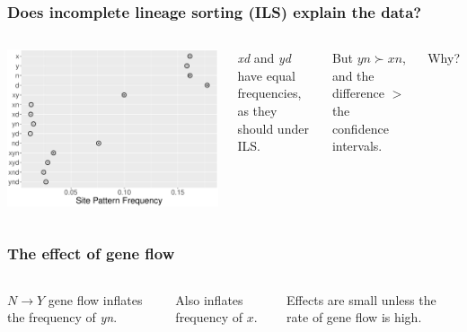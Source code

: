 \documentclass[pdftex,12pt]{beamer}
\begin{document}
\begin{frame}
  \frametitle{Does incomplete lineage sorting (ILS) explain the data?}
  \begin{columns}
    \includegraphics[width=\linewidth]{xynd-frq.pdf}
    \raggedleft

    \textit{xd} and \textit{yd} have equal frequencies, as they should
    under ILS.

    \bigskip

    But $yn \succ xn$, and the difference $>$ the confidence intervals.

    \bigskip

    Why?

  \end{columns}
  \bigskip\raggedleft
\end{frame}

\begin{frame}
  \frametitle{The effect of gene flow}
  \begin{columns}
  
  \raggedleft

  $N{\rightarrow}Y$ gene flow inflates the frequency of \textit{yn}.

  \bigskip

  Also inflates frequency of $x$.

  \bigskip

  Effects are small unless the rate of gene flow is high.
  \end{columns}
\end{frame}
\end{document}
